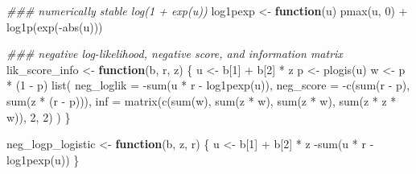 \documentclass[
  letterpaper,
  DIV=11,
  numbers=noendperiod]{scrreprt}
\newenvironment{Shaded}{\begin{snugshade}}{\end{snugshade}}
\newcommand{\AttributeTok}[1]{\textcolor[rgb]{0.40,0.45,0.13}{#1}}
\newcommand{\ControlFlowTok}[1]{\textcolor[rgb]{0.00,0.23,0.31}{\textbf{#1}}}
\newcommand{\DecValTok}[1]{\textcolor[rgb]{0.68,0.00,0.00}{#1}}
\newcommand{\DocumentationTok}[1]{\textcolor[rgb]{0.37,0.37,0.37}{\textit{#1}}}
\newcommand{\FunctionTok}[1]{\textcolor[rgb]{0.28,0.35,0.67}{#1}}
\newcommand{\NormalTok}[1]{\textcolor[rgb]{0.00,0.23,0.31}{#1}}
\newcommand{\OtherTok}[1]{\textcolor[rgb]{0.00,0.23,0.31}{#1}}
\newcommand{\SpecialCharTok}[1]{\textcolor[rgb]{0.37,0.37,0.37}{#1}}
\begin{document}
\begin{Shaded}
\begin{Highlighting}[]
\DocumentationTok{\#\#\# numerically stable log(1 + exp(u))}
\NormalTok{log1pexp }\OtherTok{\textless{}{-}} \ControlFlowTok{function}\NormalTok{(u) }\FunctionTok{pmax}\NormalTok{(u, }\DecValTok{0}\NormalTok{) }\SpecialCharTok{+} \FunctionTok{log1p}\NormalTok{(}\FunctionTok{exp}\NormalTok{(}\SpecialCharTok{{-}}\FunctionTok{abs}\NormalTok{(u)))}

\DocumentationTok{\#\#\# negative log{-}likelihood, negative score, and information matrix}
\NormalTok{lik\_score\_info }\OtherTok{\textless{}{-}} \ControlFlowTok{function}\NormalTok{(b, r, z) \{}
\NormalTok{    u }\OtherTok{\textless{}{-}}\NormalTok{ b[}\DecValTok{1}\NormalTok{] }\SpecialCharTok{+}\NormalTok{ b[}\DecValTok{2}\NormalTok{] }\SpecialCharTok{*}\NormalTok{ z}
\NormalTok{    p }\OtherTok{\textless{}{-}} \FunctionTok{plogis}\NormalTok{(u)}
\NormalTok{    w }\OtherTok{\textless{}{-}}\NormalTok{ p }\SpecialCharTok{*}\NormalTok{ (}\DecValTok{1} \SpecialCharTok{{-}}\NormalTok{ p)}
    \FunctionTok{list}\NormalTok{(}
        \AttributeTok{neg\_loglik =} \SpecialCharTok{{-}}\FunctionTok{sum}\NormalTok{(u }\SpecialCharTok{*}\NormalTok{ r }\SpecialCharTok{{-}} \FunctionTok{log1pexp}\NormalTok{(u)),}
        \AttributeTok{neg\_score  =} \SpecialCharTok{{-}}\FunctionTok{c}\NormalTok{(}\FunctionTok{sum}\NormalTok{(r }\SpecialCharTok{{-}}\NormalTok{ p), }\FunctionTok{sum}\NormalTok{(z }\SpecialCharTok{*}\NormalTok{ (r }\SpecialCharTok{{-}}\NormalTok{ p))),}
        \AttributeTok{inf        =} \FunctionTok{matrix}\NormalTok{(}\FunctionTok{c}\NormalTok{(}\FunctionTok{sum}\NormalTok{(w), }\FunctionTok{sum}\NormalTok{(z }\SpecialCharTok{*}\NormalTok{ w),}
                              \FunctionTok{sum}\NormalTok{(z }\SpecialCharTok{*}\NormalTok{ w), }\FunctionTok{sum}\NormalTok{(z }\SpecialCharTok{*}\NormalTok{ z }\SpecialCharTok{*}\NormalTok{ w)), }\DecValTok{2}\NormalTok{, }\DecValTok{2}\NormalTok{)}
\NormalTok{    )}
\NormalTok{\}}

\NormalTok{neg\_logp\_logistic }\OtherTok{\textless{}{-}} \ControlFlowTok{function}\NormalTok{(b, z, r) \{}
\NormalTok{    u }\OtherTok{\textless{}{-}}\NormalTok{ b[}\DecValTok{1}\NormalTok{] }\SpecialCharTok{+}\NormalTok{ b[}\DecValTok{2}\NormalTok{] }\SpecialCharTok{*}\NormalTok{ z}
    \SpecialCharTok{{-}}\FunctionTok{sum}\NormalTok{(u }\SpecialCharTok{*}\NormalTok{ r }\SpecialCharTok{{-}} \FunctionTok{log1pexp}\NormalTok{(u))}
\NormalTok{\}}
\end{Highlighting}
\end{Shaded}
\end{document}
